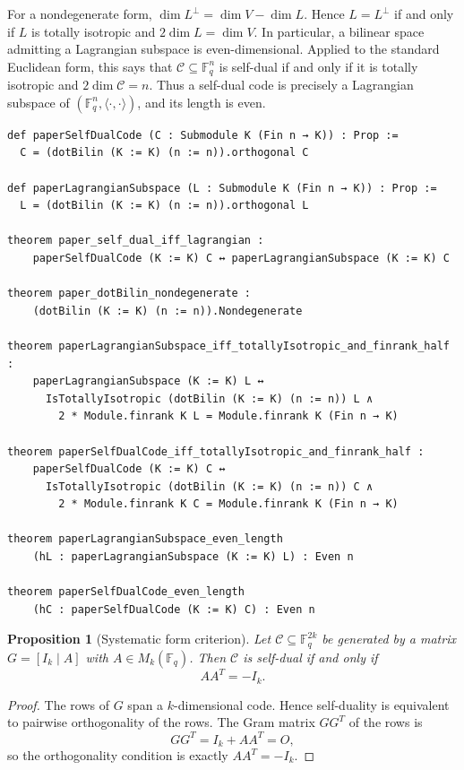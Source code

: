 \documentclass[12pt]{article}
\newtheorem{prop}[theorem]{Proposition}
\newcommand{\F}{\mathbb{F}}
\begin{document}
\noindent
For a nondegenerate form,
\(\dim L^\perp=\dim V-\dim L\). Hence \(L=L^\perp\) if and only if
\(L\) is totally isotropic and \(2\dim L=\dim V\). In particular, a
bilinear space admitting a Lagrangian subspace is even-dimensional.
Applied to the standard Euclidean form, this says that
\(\mathcal C\subseteq\F_q^n\) is self-dual if and only if it is totally isotropic
and \(2\dim\mathcal C=n\). Thus a self-dual code is precisely a Lagrangian
subspace of \((\F_q^n,\langle\cdot,\cdot\rangle)\), and its length is even.

\begin{lstlisting}[caption={Lean for Definitions~\ref{def:sd} and~\ref{def:lagrangian}.}]
def paperSelfDualCode (C : Submodule K (Fin n → K)) : Prop :=
  C = (dotBilin (K := K) (n := n)).orthogonal C

def paperLagrangianSubspace (L : Submodule K (Fin n → K)) : Prop :=
  L = (dotBilin (K := K) (n := n)).orthogonal L

theorem paper_self_dual_iff_lagrangian :
    paperSelfDualCode (K := K) C ↔ paperLagrangianSubspace (K := K) C

theorem paper_dotBilin_nondegenerate :
    (dotBilin (K := K) (n := n)).Nondegenerate

theorem paperLagrangianSubspace_iff_totallyIsotropic_and_finrank_half :
    paperLagrangianSubspace (K := K) L ↔
      IsTotallyIsotropic (dotBilin (K := K) (n := n)) L ∧
        2 * Module.finrank K L = Module.finrank K (Fin n → K)

theorem paperSelfDualCode_iff_totallyIsotropic_and_finrank_half :
    paperSelfDualCode (K := K) C ↔
      IsTotallyIsotropic (dotBilin (K := K) (n := n)) C ∧
        2 * Module.finrank K C = Module.finrank K (Fin n → K)

theorem paperLagrangianSubspace_even_length
    (hL : paperLagrangianSubspace (K := K) L) : Even n

theorem paperSelfDualCode_even_length
    (hC : paperSelfDualCode (K := K) C) : Even n
\end{lstlisting}

\begin{prop}[Systematic form criterion]\label{prop:systematic-form}
Let $\mathcal C\subseteq\F_q^{2k}$ be generated by a matrix
$G=[I_k\mid A]$ with $A\in M_k(\F_q)$. Then \(\mathcal C\) is self-dual if and only if
\[
AA^T = -I_k.
\]
\end{prop}

\begin{proof}
The rows of $G$ span a $k$-dimensional code. Hence self-duality is equivalent to pairwise orthogonality of the rows. The Gram matrix $GG^T$ of the rows is
\[
GG^T = I_k + AA^T = O,
\]
so the orthogonality condition is exactly $AA^T = -I_k$.
\end{proof}
\end{document}
